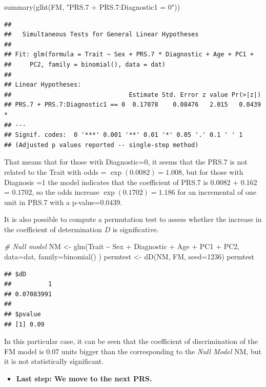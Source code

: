 \documentclass[
]{article}
\newenvironment{Shaded}{\begin{snugshade}}{\end{snugshade}}
\newcommand{\AttributeTok}[1]{\textcolor[rgb]{0.77,0.63,0.00}{#1}}
\newcommand{\CommentTok}[1]{\textcolor[rgb]{0.56,0.35,0.01}{\textit{#1}}}
\newcommand{\DecValTok}[1]{\textcolor[rgb]{0.00,0.00,0.81}{#1}}
\newcommand{\FunctionTok}[1]{\textcolor[rgb]{0.00,0.00,0.00}{#1}}
\newcommand{\NormalTok}[1]{#1}
\newcommand{\OtherTok}[1]{\textcolor[rgb]{0.56,0.35,0.01}{#1}}
\newcommand{\SpecialCharTok}[1]{\textcolor[rgb]{0.00,0.00,0.00}{#1}}
\newcommand{\StringTok}[1]{\textcolor[rgb]{0.31,0.60,0.02}{#1}}
\providecommand{\tightlist}{%
  \setlength{\itemsep}{0pt}\setlength{\parskip}{0pt}}
\begin{document}
\begin{Shaded}
\begin{Highlighting}[]
\FunctionTok{summary}\NormalTok{(}\FunctionTok{glht}\NormalTok{(FM, }\StringTok{"PRS.7  + PRS.7:Diagnostic1 = 0"}\NormalTok{))}
\end{Highlighting}
\end{Shaded}

\begin{verbatim}
## 
##   Simultaneous Tests for General Linear Hypotheses
## 
## Fit: glm(formula = Trait ~ Sex + PRS.7 * Diagnostic + Age + PC1 + 
##     PC2, family = binomial(), data = dat)
## 
## Linear Hypotheses:
##                                Estimate Std. Error z value Pr(>|z|)  
## PRS.7 + PRS.7:Diagnostic1 == 0  0.17078    0.08476   2.015   0.0439 *
## ---
## Signif. codes:  0 '***' 0.001 '**' 0.01 '*' 0.05 '.' 0.1 ' ' 1
## (Adjusted p values reported -- single-step method)
\end{verbatim}

That means that for those with Diagnostic=0, it seems that the PRS.7 is
not related to the Trait with odds = \(\exp(0.0082) = 1.008\), but for
those with Diagnosis =1 the model indicates that the coefficient of
PRS.7 is 0.0082 + 0.162 = 0.1702, so the odds increase
\(\exp(0.1702) = 1.186\) for an incremental of one unit in PRS.7 with a
p-value=0.0439.

It is also possible to compute a permutation test to assess whether the
increase in the coefficient of determination \(D\) is significative.

\begin{Shaded}
\begin{Highlighting}[]
\CommentTok{\# Null model}
\NormalTok{NM }\OtherTok{\textless{}{-}} \FunctionTok{glm}\NormalTok{(Trait }\SpecialCharTok{\textasciitilde{}}\NormalTok{  Sex }\SpecialCharTok{+}\NormalTok{ Diagnostic }\SpecialCharTok{+}\NormalTok{ Age }\SpecialCharTok{+}\NormalTok{ PC1 }\SpecialCharTok{+}\NormalTok{ PC2, }\AttributeTok{data=}\NormalTok{dat, }\AttributeTok{family=}\FunctionTok{binomial}\NormalTok{() )}
\NormalTok{permtest }\OtherTok{\textless{}{-}} \FunctionTok{dD}\NormalTok{(NM, FM, }\AttributeTok{seed=}\DecValTok{1236}\NormalTok{)}
\NormalTok{permtest}
\end{Highlighting}
\end{Shaded}

\begin{verbatim}
## $dD
##          1 
## 0.07083991 
## 
## $pvalue
## [1] 0.09
\end{verbatim}

In this particular case, it can be seen that the coefficient of
discrimination of the FM model is 0.07 units bigger than the
corresponding to the \emph{Null Model} NM, but it is not statistically
significant.

\begin{itemize}
\tightlist
\item
  \textbf{Last step: We move to the next PRS.}
\end{itemize}
\end{document}
